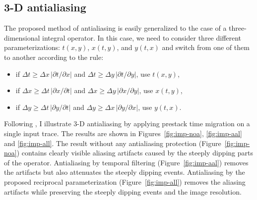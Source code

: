 \subsection{3-D antialiasing}

The proposed method of antialiasing is easily generalized to the case
of a three-dimensional integral operator. In this case, we need to
consider three different parameterizations: $t(x,y)$, $x(t,y)$, and
$y(t,x)$ and switch from one of them to another according to the rule:
\begin{itemize}
\item if $\Delta t \geq {{\Delta x} \, {|\partial t / \partial x|}}$
and      $\Delta t \geq {{\Delta y} \, {|\partial t / \partial y|}}$,
use $t(x,y)$,
\item if $\Delta x \geq {{\Delta t} \, {|\partial x / \partial t|}}$
and      $\Delta x \geq {{\Delta y} \, {|\partial x / \partial y|}}$,
use $x(t,y)$,
\item if $\Delta y \geq {{\Delta t} \, {|\partial y / \partial t|}}$
and      $\Delta y \geq {{\Delta x} \, {|\partial y / \partial x|}}$,
use $y(t,x)$.
\end{itemize}

Following \cite{GEO66-02-06540666}, I illustrate 3-D
antialiasing by applying prestack time migration on a single input
trace. The results are shown in Figures~\ref{fig:imp-noa},
\ref{fig:imp-aal} and \ref{fig:imp-all}. The result without any
antialiasing protection (Figure~\ref{fig:imp-noa}) contains clearly
visible aliasing artifacts caused by the steeply dipping parts of the
operator. Antialiasing by temporal filtering
(Figure~\ref{fig:imp-aal}) removes the artifacts but also attenuates
the steeply dipping events. Antialiasing by the proposed reciprocal
parameterization (Figure~\ref{fig:imp-all}) removes the aliasing
artifacts while preserving the steeply dipping events and the image
resolution.




